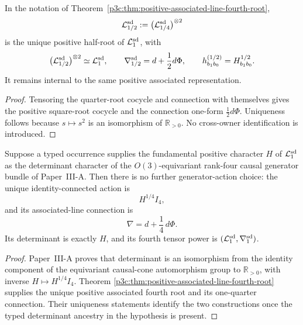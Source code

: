 \documentclass[12pt,a4paper]{article}
\begin{document}
\begin{corollary}
\label{p3c:cor:positive-associated-line-half-root}
In the notation of
Theorem~\ref{p3c:thm:positive-associated-line-fourth-root},
\[
 \mathcal L^{\rm sd}_{1/2}
 :=\bigl(\mathcal L^{\rm sd}_{1/4}\bigr)^{\otimes2}
\]
is the unique positive half-root of \(\mathcal L^{\rm sd}_1\), with
\[
 \bigl(\mathcal L^{\rm sd}_{1/2}\bigr)^{\otimes2}
 \simeq\mathcal L^{\rm sd}_1,
 \qquad
 \nabla^{\rm sd}_{1/2}=d+\frac12d\Phi,
 \qquad
 h^{(1/2)}_{b_1b_0}=H_{b_1b_0}^{1/2}.
\]
It remains internal to the same positive associated representation.
\end{corollary}

\begin{proof}
Tensoring the quarter-root cocycle and connection with themselves gives the
positive square-root cocycle and the connection one-form
\(\tfrac12d\Phi\).  Uniqueness follows because
\(s\mapsto s^2\) is an isomorphism of \(\mathbb R_{>0}\).  No cross-owner
identification is introduced.
\end{proof}

\begin{corollary}
\label{p3c:cor:operational-generator-root-transport}
Suppose a typed occurrence supplies the fundamental positive character
\(H\) of \(\mathcal L^{\rm sd}_1\) as the determinant character of the
\(O(3)\)-equivariant rank-four causal generator bundle of Paper~III-A.  Then
there is no further generator-action choice: the unique identity-connected
action is
\[
                 H^{1/4}I_4,
\]
and its associated-line connection is
\[
                 \nabla=d+\frac14\,d\Phi .
\]
Its determinant is exactly \(H\), and its fourth tensor power is
\((\mathcal L^{\rm sd}_1,\nabla^{\rm sd}_1)\).
\end{corollary}

\begin{proof}
Paper~III-A proves that determinant is an isomorphism from the identity
component of the equivariant causal-cone automorphism group to
\(\mathbb R_{>0}\), with inverse \(H\mapsto H^{1/4}I_4\).  Theorem
\ref{p3c:thm:positive-associated-line-fourth-root} supplies the unique
positive associated fourth root and its one-quarter connection.  Their
uniqueness statements identify the two constructions once the typed
determinant ancestry in the hypothesis is present.
\end{proof}
\end{document}
